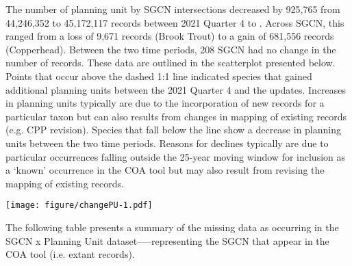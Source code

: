 \documentclass{article}\usepackage[]{graphicx}\usepackage[table]{xcolor}
\begin{document}
\noindent The number of planning unit by SGCN intersections decreased  by 925,765 from 44,246,352 to 45,172,117 records between 2021 Quarter 4 to . Across SGCN, this ranged from a loss of 9,671 records (Brook Trout) to a gain of 681,556 records (Copperhead). Between the two time periods, 208 SGCN had no change in the number of records. These data are outlined in the scatterplot presented below. Points that occur above the dashed 1:1 line indicated species that gained additional planning units between the 2021 Quarter 4 and the  updates. Increases in planning units typically are due to the incorporation of new records for a particular taxon but can also results from changes in mapping of existing records (e.g. CPP revision). Species that fall below the line show a decrease in planning units between the two time periods. Reasons for declines typically are due to particular occurrences falling outside the 25-year moving window for inclusion as a ‘known’ occurrence in the COA tool but may also result from revising the mapping of existing records.\\


\begin{center}
\texttt{[image: figure/changePU-1.pdf]}    %
\end{center}

\noindent The following table presents a summary of the missing data as occurring in the SGCN x Planning Unit dataset--—representing the SGCN that appear in the COA tool (i.e. extant records).\\
\end{document}
